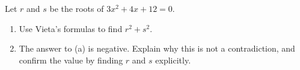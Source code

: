Let $r$ and $s$ be the roots of $3x^2+4x+12=0$.
\begin{enumerate}
\item[(a)] Use Vieta's formulas to find $r^2+s^2$.
\item[(b)] The answer to (a) is negative. Explain why this is not a contradiction, and confirm the value by finding $r$ and $s$ explicitly.
\end{enumerate}
